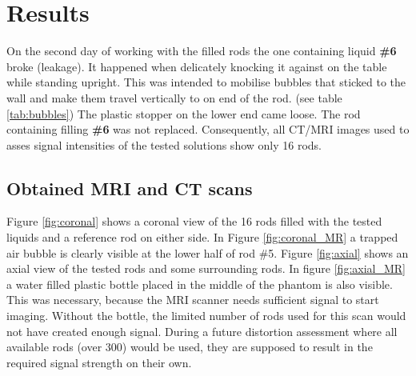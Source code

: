 

\chapter{Results}

On the second day of working with the filled rods the one containing liquid \textbf{\#6} broke (leakage).
It happened when delicately knocking it against on the table while standing upright.
This was intended to mobilise bubbles that sticked to the wall and make them travel vertically to on end of the rod. (see table \ref{tab:bubbles})
The plastic stopper on the lower end came loose.
The rod containing filling \textbf{\#6} was not replaced.
Consequently, all CT/MRI images used to asses signal intensities of the tested solutions show only 16 rods.

\section{Obtained MRI and CT scans}
Figure \ref{fig:coronal} shows a coronal view of the 16 rods filled with the tested liquids and a reference rod on either side.
In Figure \ref{fig:coronal_MR} a trapped air bubble is clearly visible at the lower half of rod \#5.
Figure \ref{fig:axial} shows an axial view of the tested rods and some surrounding rods.
In figure \ref{fig:axial_MR} a water filled plastic bottle placed in the middle of the phantom is also visible.
This was necessary, because the MRI scanner needs sufficient signal to start imaging.
Without the bottle, the limited number of rods used for this scan would not have created enough signal.
During a future distortion assessment where all available rods (over 300) would be used, they are supposed to result in the required signal strength on their own.
 
